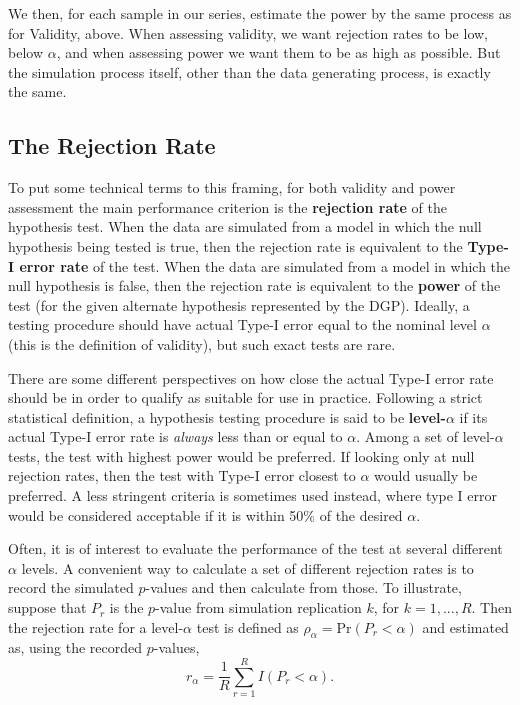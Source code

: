 \documentclass[
]{book}
\begin{document}
We then, for each sample in our series, estimate the power by the same process as for Validity, above.
When assessing validity, we want rejection rates to be low, below \(\alpha\), and when assessing power we want them to be as high as possible. But the simulation process itself, other than the data generating process, is exactly the same.

\hypertarget{the-rejection-rate}{%
\subsection{The Rejection Rate}\label{the-rejection-rate}}

To put some technical terms to this framing, for both validity and power assessment the main performance criterion is the \textbf{rejection rate} of the hypothesis test. When the data are simulated from a model in which the null hypothesis being tested is true, then the rejection rate is equivalent to the \textbf{Type-I error rate} of the test. When the data are simulated from a model in which the null hypothesis is false, then the rejection rate is equivalent to the \textbf{power} of the test (for the given alternate hypothesis represented by the DGP).
Ideally, a testing procedure should have actual Type-I error equal to the nominal level \(\alpha\) (this is the definition of validity), but such exact tests are rare.

There are some different perspectives on how close the actual Type-I error rate should be in order to qualify as suitable for use in practice. Following a strict statistical definition, a hypothesis testing procedure is said to be \textbf{level-\(\alpha\)} if its actual Type-I error rate is \emph{always} less than or equal to \(\alpha\).
Among a set of level-\(\alpha\) tests, the test with highest power would be preferred.
If looking only at null rejection rates, then the test with Type-I error closest to \(\alpha\) would usually be preferred.
A less stringent criteria is sometimes used instead, where type I error would be considered acceptable if it is within 50\% of the desired \(\alpha\).

Often, it is of interest to evaluate the performance of the test at several different \(\alpha\) levels.
A convenient way to calculate a set of different rejection rates is to record the simulated \(p\)-values and then calculate from those.
To illustrate, suppose that \(P_r\) is the \(p\)-value from simulation replication \(k\), for \(k = 1,...,R\).
Then the rejection rate for a level-\(\alpha\) test is defined as \(\rho_\alpha = \text{Pr}\left(P_r < \alpha\right)\) and estimated as, using the recorded \(p\)-values,
\[r_\alpha = \frac{1}{R} \sum_{r=1}^R I(P_r < \alpha).\]
\end{document}
